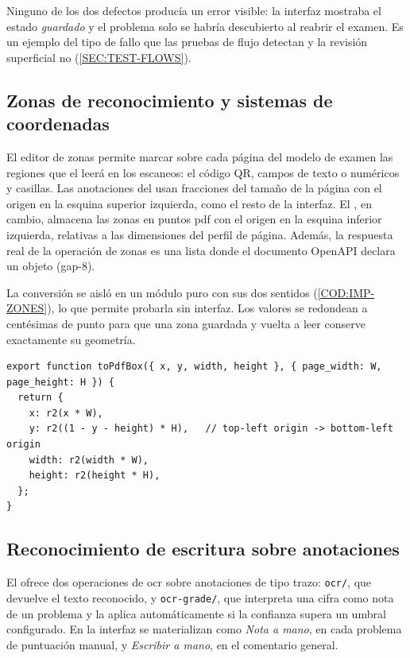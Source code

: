 Ninguno de los dos defectos producía un error visible: la interfaz mostraba el estado
\emph{guardado} y el problema solo se habría descubierto al reabrir el examen. Es un ejemplo
del tipo de fallo que las pruebas de flujo detectan y la revisión superficial no
(\cref{SEC:TEST-FLOWS}).

\subsection{Zonas de reconocimiento y sistemas de coordenadas}

El editor de zonas permite marcar sobre cada página del modelo de examen las regiones que el
 leerá en los escaneos: el código QR, campos de texto o numéricos y casillas.
Las anotaciones del  usan fracciones del tamaño de la página con el origen en
la esquina superior izquierda, como el resto de la interfaz. El , en cambio,
almacena las zonas en puntos \acs{pdf} con el origen en la esquina inferior izquierda,
relativas a las dimensiones del perfil de página. Además, la respuesta real de la operación
de zonas es una lista donde el documento OpenAPI declara un objeto (gap-8).

La conversión se aisló en un módulo puro con sus dos sentidos (\cref{COD:IMP-ZONES}), lo que
permite probarla sin interfaz. Los valores se redondean a centésimas de punto para que una
zona guardada y vuelta a leer conserve exactamente su geometría.

\begin{lstlisting}[caption={Conversión de la caja del editor a la geometría de la
  \acs{api} (\texttt{features/exams/setup/zoneGeometry.js}).},label={COD:IMP-ZONES}]
export function toPdfBox({ x, y, width, height }, { page_width: W, page_height: H }) {
  return {
    x: r2(x * W),
    y: r2((1 - y - height) * H),   // top-left origin -> bottom-left origin
    width: r2(width * W),
    height: r2(height * H),
  };
}
\end{lstlisting}

\subsection{Reconocimiento de escritura sobre anotaciones}

El  ofrece dos operaciones de \acs{ocr} sobre anotaciones de tipo trazo:
\texttt{ocr/}, que devuelve el texto reconocido, y \texttt{ocr-grade/}, que interpreta una
cifra como nota de un problema y la aplica automáticamente si la confianza supera un umbral
configurado. En la interfaz se materializan como \emph{Nota a mano}, en cada problema de
puntuación manual, y \emph{Escribir a mano}, en el comentario general.

